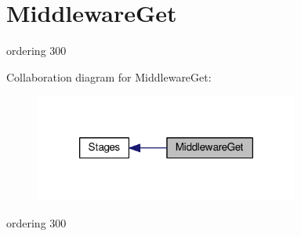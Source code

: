 \hypertarget{group__MiddlewareGet}{\section{Middleware\-Get}
\label{group__MiddlewareGet}
}


ordering 300  


Collaboration diagram for Middleware\-Get\-:
\nopagebreak
\begin{figure}[H]
\begin{center}
\leavevmode
\includegraphics[width=246pt]{group__MiddlewareGet}
\end{center}
\end{figure}
ordering 300 